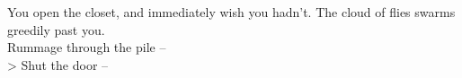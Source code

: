 You open the closet, and immediately wish you hadn’t. The cloud of flies swarms greedily past you.\\

 Rummage through the pile -- \\
> Shut the door -- 